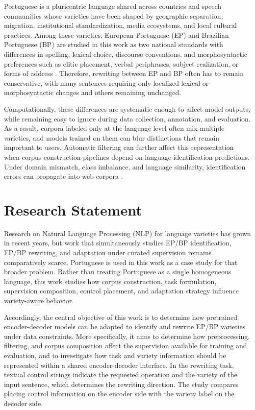 Portuguese is a pluricentric language shared across countries and speech
communities whose varieties have been shaped by geographic
separation, migration, institutional standardization, media ecosystems, and
local cultural practices. Among these varieties, European Portuguese (EP) and
Brazilian Portuguese (BP) are studied in this work as two national standards with
differences in spelling, lexical choice, discourse conventions, and
morphosyntactic preferences such as clitic placement, verbal periphrases,
subject realization, or forms of address
\citep{barreiro-mota-2018-paraphrastic}. Therefore, rewriting between EP and BP
often has to remain conservative, with many sentences requiring only localized
lexical or morphosyntactic changes and others remaining unchanged.

Computationally, these differences are systematic enough to affect model
outputs, while remaining easy to ignore during data collection, annotation,
and evaluation. As a result, corpora labeled only at the language level often
mix multiple varieties, and models trained on them can blur distinctions that
remain important to users. Automatic filtering can further affect this
representation when corpus-construction pipelines depend on
language-identification predictions. Under domain mismatch, class imbalance, and language similarity, identification
errors can propagate into web corpora \citep{caswell-etal-2020-language-id-wild}.

\section{Research Statement}
\label{sec:intro-research-statement}

Research on Natural Language Processing (NLP) for language varieties has grown
in recent years, but work that simultaneously studies EP/BP identification, EP/BP
rewriting, and adaptation under curated supervision remains
comparatively scarce. Portuguese is used in this work as a case study for that broader
problem. Rather than treating Portuguese as a single homogeneous language, this
work studies how corpus construction, task formulation, supervision
composition, control placement, and adaptation strategy influence
variety-aware behavior.

Accordingly, the central objective of this work is to determine how
pretrained encoder-decoder models can be adapted to identify and rewrite EP/BP
varieties under data constraints. More specifically, it aims to determine how
preprocessing, filtering, and corpus composition affect the supervision
available for training and evaluation, and to investigate how task and variety
information should be represented within a shared encoder-decoder interface.
In the rewriting task, textual control strings indicate the requested
operation and the variety of the input sentence, which determines the
rewriting direction. The study compares placing control information on the
encoder side with the variety label on the decoder side.

